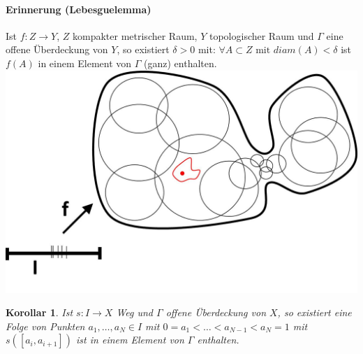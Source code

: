 \documentclass[a4paper,11pt,notitlepage]{report}
\newtheorem{corollary}{Korollar}[chapter]
\begin{document}
\paragraph{Erinnerung (Lebesguelemma)}
Ist $f \colon Z \rightarrow Y$, $Z$ kompakter metrischer Raum, $Y$ topologischer Raum und $\Gamma$ eine offene Überdeckung von $Y$, so existiert $\delta > 0$ mit: \newline  $\forall A \subset Z \text{ mit } diam(A) < \delta$ ist $f(A)$ in einem Element von $\Gamma$ (ganz) enthalten. \newline \includegraphics[scale=0.4]{images/Lebesguelemma.jpg}

\begin{corollary}{}
	Ist $s \colon I \rightarrow X$ Weg und $\Gamma$ offene Überdeckung von $X$, so existiert eine Folge von Punkten \newline $a_1, \ldots, a_N \in I$ mit $0 = a_1 < \ldots < a_{N-1} < a_N = 1$ mit \newline $s([a_i, a_{i+1}])$ ist in einem Element von $\Gamma$ enthalten.
\end{corollary}
\end{document}
